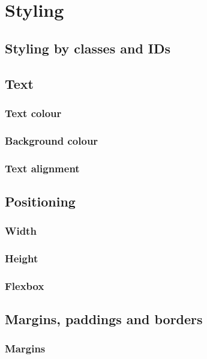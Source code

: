 \chapter{Styling}

\section{Styling by classes and IDs}


\section{Text}

\subsection{Text colour}

\subsection{Background colour}

\subsection{Text alignment}

\section{Positioning}

\subsection{Width}

\subsection{Height}

\subsection{Flexbox}

\section{Margins, paddings and borders}

\subsection{Margins}

